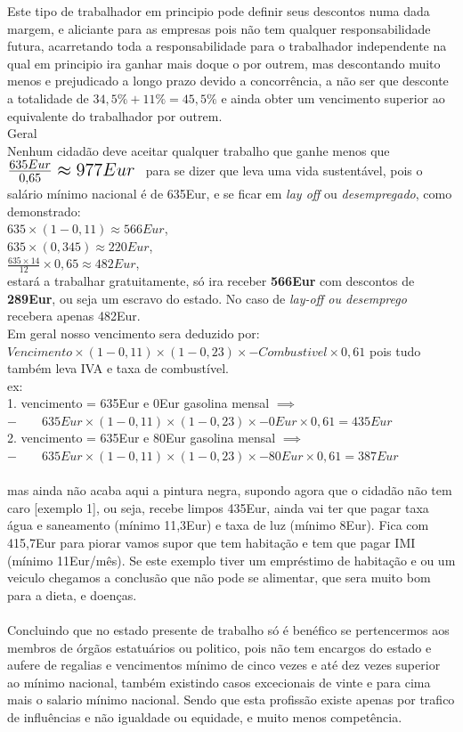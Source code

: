 Este tipo de trabalhador em principio pode definir seus descontos numa dada margem, e aliciante para as empresas pois não tem qualquer responsabilidade futura, acarretando toda a responsabilidade para o trabalhador independente na qual em principio ira ganhar mais doque o por outrem, mas descontando muito menos e prejudicado a longo prazo devido a concorrência, a não ser que desconte a totalidade de $34,5\%+11\%=45,5\%$ e ainda obter um vencimento superior ao equivalente do trabalhador por outrem.\\

Geral\\
Nenhum cidadão deve aceitar qualquer trabalho que ganhe menos que \; $ \mbox{\Large $ \frac{635Eur}{0,65}\approx 977Eur $ } $ para se dizer que leva uma vida sustentável, pois o salário mínimo nacional é de 635Eur, e se ficar em \textit{lay off} ou \textit{desempregado}, como demonstrado:\\
$635\times(1-0,11)\approx566Eur$,\\
$635\times(0,345)\approx220Eur$,\\
$\frac{635\times14}{12}\times0,65 \approx 482Eur$, \\
estará a trabalhar gratuitamente, só ira receber \textbf{566Eur} com descontos de \textbf{289Eur}, ou seja um escravo do estado. No caso de \textit{lay-off ou desemprego} recebera apenas 482Eur.\\

Em geral nosso vencimento sera deduzido por: $Vencimento \times (1-0,11) \times (1-0,23) \times - Combustivel\times 0,61$ pois tudo também leva IVA e taxa de combustível.\\
ex:\\
1. vencimento = 635Eur e 0Eur gasolina mensal $\implies$ \\
$- \qquad 635Eur \times (1-0,11) \times (1-0,23) \times - 0Eur \times 0,61 = 435Eur$ \\
2. vencimento = 635Eur e 80Eur gasolina mensal $\implies$ \\
$- \qquad 635Eur \times (1-0,11) \times (1-0,23) \times - 80Eur \times 0,61 = 387Eur$ \\ \\
mas ainda não acaba aqui a pintura negra, supondo agora que o cidadão não tem caro [exemplo 1], ou seja, recebe limpos 435Eur, ainda vai ter que pagar taxa água e saneamento (mínimo 11,3Eur) e taxa de luz (mínimo 8Eur). Fica com 415,7Eur para piorar vamos supor que tem habitação e tem que pagar IMI (mínimo 11Eur/mês).
Se este exemplo tiver um empréstimo de habitação e ou um veiculo chegamos a conclusão que não pode se alimentar, que sera muito bom para a dieta, e doenças.\\ \\
Concluindo que no estado presente de trabalho só é benéfico se pertencermos aos membros de órgãos estatuários ou politico, pois não tem encargos do estado e aufere de regalias e vencimentos mínimo de cinco vezes e até dez vezes superior ao mínimo nacional, também existindo casos excecionais de vinte e para cima mais o salario mínimo nacional. Sendo que esta profissão existe apenas por trafico de influências e não igualdade ou equidade, e muito menos competência.\\


